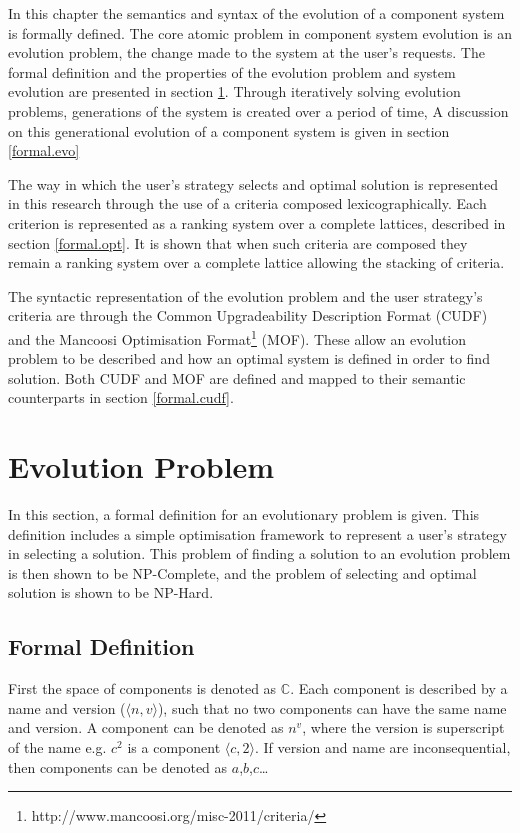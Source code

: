 In this chapter the semantics and syntax of the evolution of a component system is formally defined.
The core atomic problem in component system evolution is an evolution problem, the change made to the system at the user's requests.
The formal definition and the properties of the evolution problem and system evolution are presented in section \ref{formal.step}.
Through iteratively solving evolution problems, generations of the system is created over a period of time,
A discussion on this generational evolution of a component system is given in section \ref{formal.evo}

The way in which the user's strategy selects and optimal solution is represented in this research through the use of a criteria composed lexicographically.
Each criterion is represented as a ranking system over a complete lattices, described in section \ref{formal.opt}.
It is shown that when such criteria are composed they remain a ranking system over a complete lattice allowing the stacking of criteria.

The syntactic representation of the evolution problem and the user strategy's criteria 
are through the Common Upgradeability Description Format (CUDF) \citep{treinen2009common} 
and the Mancoosi Optimisation Format\footnote{http://www.mancoosi.org/misc-2011/criteria/} (MOF).
These allow an evolution problem to be described and how an optimal system is defined in order to find solution.
Both CUDF and MOF are defined and mapped to their semantic counterparts in section \ref{formal.cudf}. 

\section{Evolution Problem}
\label{formal.step}
In this section, a formal definition for an evolutionary problem is given.
This definition includes a simple optimisation framework to represent a user's strategy in selecting a solution.
This problem of finding a solution to an evolution problem is then shown to be NP-Complete,
and the problem of selecting and optimal solution is shown to be NP-Hard.

\subsection{Formal Definition}
First the space of components is denoted as $\mathbb{C}$.
Each component is described by a name and version ($\langle n, v\rangle$), such that no two components can have the same name and version.
A component can be denoted as $n^v$, where the version is superscript of the name e.g. $c^2$ is a component $\langle c, 2\rangle$.
If version and name are inconsequential, then components can be denoted as $a$,$b$,$c$\ldots

